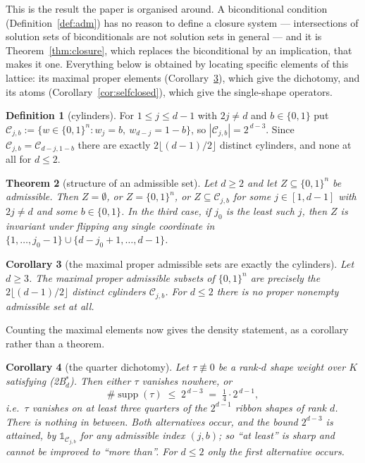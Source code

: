 \documentclass[11pt]{article}
\newtheorem{theorem}{Theorem}[section]
\newtheorem{corollary}[theorem]{Corollary}
\theoremstyle{definition}
\newtheorem{definition}[theorem]{Definition}
\theoremstyle{remark}
\newcommand{\cube}{\{0,1\}}
\newcommand{\Cyl}{\mathcal{C}}           %
\newcommand{\one}{\mathbb{1}}
\newcommand{\supp}{\operatorname{supp}}
\begin{document}
This is the result the paper is organised around.  A biconditional condition
(Definition~\ref{def:adm}) has no reason to define a closure system --- intersections of
solution sets of biconditionals are not solution sets in general --- and it is
Theorem~\ref{thm:closure}, which replaces the biconditional by an implication, that makes it
one.  Everything below is obtained by locating specific elements of this lattice: its maximal
proper elements (Corollary~\ref{cor:maximal}), which give the dichotomy, and its atoms
(Corollary~\ref{cor:selfclosed}), which give the single-shape operators.

\begin{definition}[cylinders]\label{def:cyl}
For $1\le j\le d-1$ with $2j\ne d$ and $b\in\cube$ put
$\Cyl_{j,b}:=\{w\in\cube^{n}:w_j=b,\ w_{d-j}=1-b\}$, so $|\Cyl_{j,b}|=2^{\,d-3}$.  Since
$\Cyl_{j,b}=\Cyl_{d-j,1-b}$ there are exactly $2\lfloor(d-1)/2\rfloor$ distinct cylinders,
and none at all for $d\le2$.
\end{definition}

\begin{theorem}[structure of an admissible set]\label{thm:struct}
Let $d\ge2$ and let $Z\subseteq\cube^{n}$ be admissible.  Then $Z=\emptyset$, or
$Z=\cube^{n}$, or $Z\subseteq\Cyl_{j,b}$ for some $j\in[1,d-1]$ with $2j\ne d$ and some
$b\in\cube$.  In the third case, if $j_0$ is the least such $j$, then $Z$ is invariant under
flipping any single coordinate in $\{1,\dots,j_0-1\}\cup\{d-j_0+1,\dots,d-1\}$.
\end{theorem}

\begin{corollary}[the maximal proper admissible sets are exactly the cylinders]\label{cor:maximal}
Let $d\ge3$.  The maximal proper admissible subsets of $\cube^{n}$ are precisely the
$2\lfloor(d-1)/2\rfloor$ distinct cylinders $\Cyl_{j,b}$.  For $d\le2$ there is no proper
nonempty admissible set at all.
\end{corollary}

Counting the maximal elements now gives the density statement, as a corollary rather than a
theorem.

\begin{corollary}[the quarter dichotomy]\label{cor:quarter}
Let $\tau\not\equiv0$ be a rank-$d$ shape weight over $K$ satisfying
\textnormal{(2B$^{*}_d$)}.  Then \emph{either} $\tau$ vanishes nowhere, \emph{or}
\[
   \#\supp(\tau)\;\le\;2^{\,d-3}\;=\;\tfrac14\cdot2^{\,d-1},
\]
i.e.\ $\tau$ vanishes on \emph{at least} three quarters of the $2^{d-1}$ ribbon shapes of rank
$d$.  There is nothing in between.  Both alternatives occur, and the bound $2^{d-3}$ is
\emph{attained}, by $\one_{\Cyl_{j,b}}$ for any admissible index $(j,b)$; so ``at least'' is
sharp and cannot be improved to ``more than''.  For $d\le2$ only the first alternative occurs.
\end{corollary}
\end{document}
